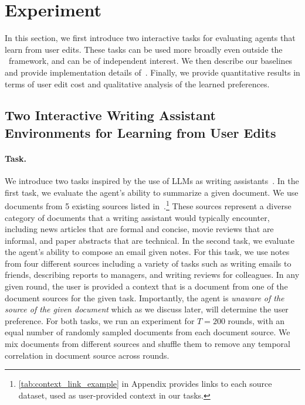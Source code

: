 
\section{Experiment}

In this section, we first introduce two interactive tasks for evaluating agents that learn from user edits. These tasks can be used more broadly even outside the \framework~framework, and can be of independent interest. We then describe our baselines and provide implementation details of~\algname. Finally, we provide quantitative results in terms of user edit cost and qualitative analysis of the learned preferences.

\subsection{Two Interactive Writing Assistant Environments for Learning from User Edits}

\paragraph{Task.} We introduce two tasks inspired by the use of LLMs as writing assistants~\citep{mysore2023pearl,shen2023beyond,wang2023writing}. In the first task, we evaluate the agent's ability to summarize a given document. We use documents from 5 existing sources listed in~.\footnote{\autoref{tab:context_link_example} in Appendix provides links to each source dataset, used as user-provided context in our tasks.}
These sources represent a diverse category of documents that a writing assistant would typically encounter, including news articles that are formal and concise, movie reviews that are informal, and paper abstracts that are technical. 
In the second task, we evaluate the agent's ability to compose an email given notes. For this task, we use notes from four different sources including a variety of tasks such as writing emails to friends, describing reports to managers, and writing reviews for colleagues. In any given round, the user is provided a context that is a document from one of the document sources for the given task. Importantly, the agent is \emph{unaware of the source of the given document} which as we discuss later, will determine the user preference. For both tasks, we run an experiment for $T = 200$ rounds, with an equal number of randomly sampled documents from each document source. We mix documents from different sources and shuffle them to remove any temporal correlation in document source across rounds.%









